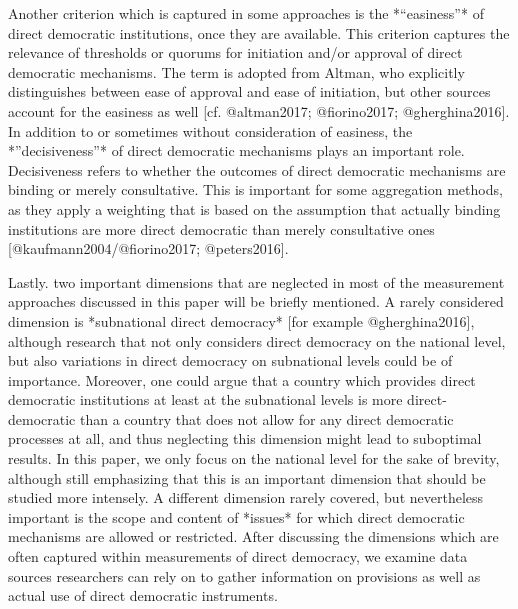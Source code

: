 \documentclass{systats}
\begin{document}
Another criterion which is captured in some approaches is the *“easiness”* of direct democratic institutions, once they are available. This criterion captures the relevance of thresholds or quorums for initiation and/or approval of direct democratic mechanisms. The term is adopted from Altman, who explicitly distinguishes between ease of approval and ease of initiation, but other sources account for the easiness as well [cf. @altman2017; @fiorino2017; @gherghina2016]. 
In addition to or sometimes without consideration of easiness, the *”decisiveness”* of direct democratic mechanisms plays an important role. Decisiveness refers to whether the outcomes of direct democratic mechanisms are binding or merely consultative. This is important for some aggregation methods, as they  apply a weighting that is based on the assumption that actually binding institutions are more direct democratic than merely consultative ones [@kaufmann2004/@fiorino2017; @peters2016]. 

Lastly. two important dimensions that are neglected in most of the measurement approaches discussed in this paper will be briefly mentioned. A rarely considered dimension is *subnational direct democracy* [for example @gherghina2016], although research that not only considers direct democracy on the national level, but also variations in direct democracy on subnational levels could be of importance. Moreover, one could argue that a country which provides direct democratic institutions at least at the subnational levels is more direct-democratic than a country that does not allow for any direct democratic processes at all, and thus neglecting this dimension might lead to suboptimal results. In this paper, we only focus on the national level for the sake of brevity, although still emphasizing that this is an important dimension that should be studied more intensely. A different dimension rarely covered, but nevertheless important is the scope and content of *issues* for which direct democratic mechanisms are allowed or restricted. After discussing the dimensions which are often captured within measurements of direct democracy, we examine data sources researchers can rely on to gather information on provisions as well as actual use of direct democratic instruments.



%	
%	
\end{document}
